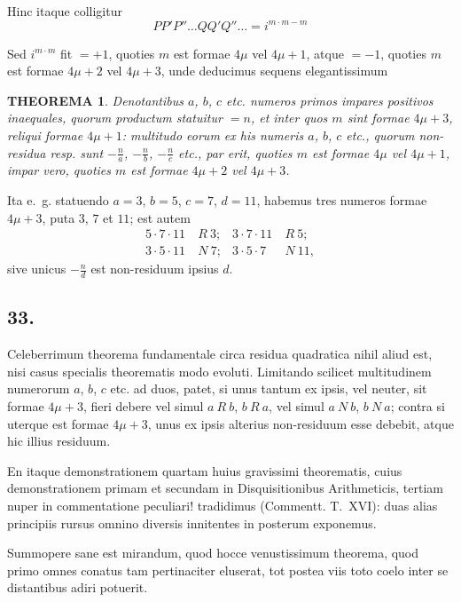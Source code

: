 \documentclass[12pt,a4paper]{article}
\theoremstyle{plain}
\newtheorem*{theorem}{THEOREMA}
\theoremstyle{definition}
\theoremstyle{remark}
\begin{document}
Hinc itaque colligitur
\[PP'P''\ldots QQ'Q''\ldots = i^{m \cdot m - m}\]

Sed $i^{m \cdot m}$ fit $=+1$, quoties $m$ est formae $4\mu$ vel $4\mu+1$, atque $=-1$, quoties $m$ est formae $4\mu+2$ vel $4\mu+3$, unde deducimus sequens elegantissimum

\begin{theorem}
Denotantibus $a$, $b$, $c$ etc. numeros primos impares positivos inaequales, quorum productum statuitur $=n$, et inter quos $m$ sint formae $4\mu+3$, reliqui formae $4\mu+1$: multitudo eorum ex his numeris $a$, $b$, $c$ etc., quorum non-residua resp. sunt $-\frac{n}{a}$, $-\frac{n}{b}$, $-\frac{n}{c}$ etc., par erit, quoties $m$ est formae $4\mu$ vel $4\mu+1$, impar vero, quoties $m$ est formae $4\mu+2$ vel $4\mu+3$.
\end{theorem}

Ita e.~g. statuendo $a=3$, $b=5$, $c=7$, $d=11$, habemus tres numeros formae $4\mu+3$, puta $3$, $7$ et $11$; est autem
\begin{align*}
5 \cdot 7 \cdot 11 &\ R \ 3; & 3 \cdot 7 \cdot 11 &\ R \ 5;\\
3 \cdot 5 \cdot 11 &\ N \ 7; & 3 \cdot 5 \cdot 7 &\ N \ 11,
\end{align*}
sive unicus $-\frac{n}{d}$ est non-residuum ipsius $d$.

\subsection*{33.}
Celeberrimum theorema fundamentale circa residua quadratica nihil aliud est, nisi casus specialis theorematis modo evoluti. Limitando scilicet multitudinem numerorum $a$, $b$, $c$ etc. ad duos, patet, si unus tantum ex ipsis, vel neuter, sit formae $4\mu+3$, fieri debere vel simul $a \ R \ b$, $b \ R \ a$, vel simul $a \ N \ b$, $b \ N \ a$; contra si uterque est formae $4\mu+3$, unus ex ipsis alterius non-residuum esse debebit, atque hic illius residuum.

En itaque demonstrationem quartam huius gravissimi theorematis, cuius demonstrationem primam et secundam in Disquisitionibus Arithmeticis, tertiam nuper in commentatione peculiari! tradidimus (Commentt. T.~XVI): duas alias principiis rursus omnino diversis innitentes in posterum exponemus.

Summopere sane est mirandum, quod hocce venustissimum theorema, quod primo omnes conatus tam pertinaciter eluserat, tot postea viis toto coelo inter se distantibus adiri potuerit.
\end{document}
